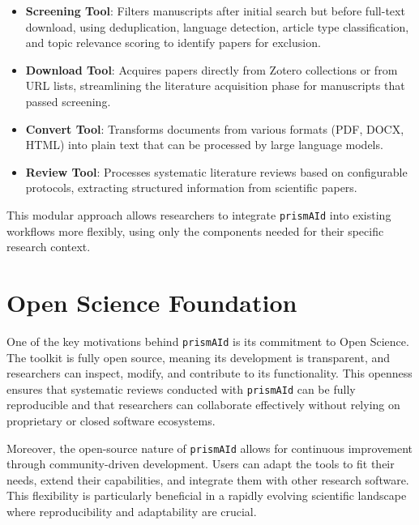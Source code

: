 \begin{itemize}
    \item \textbf{Screening Tool}: Filters manuscripts after initial search but before full-text download, using deduplication, language detection, article type classification, and topic relevance scoring to identify papers for exclusion.

    \item \textbf{Download Tool}: Acquires papers directly from Zotero collections or from URL lists, streamlining the literature acquisition phase for manuscripts that passed screening.

    \item \textbf{Convert Tool}: Transforms documents from various formats (PDF, DOCX, HTML) into plain text that can be processed by large language models.

    \item \textbf{Review Tool}: Processes systematic literature reviews based on configurable protocols, extracting structured information from scientific papers.
\end{itemize}

This modular approach allows researchers to integrate \texttt{prismAId} into existing workflows more flexibly, using only the components needed for their specific research context.

\section{Open Science Foundation}

One of the key motivations behind \texttt{prismAId} is its commitment to Open Science. The toolkit is fully open source, meaning its development is transparent, and researchers can inspect, modify, and contribute to its functionality. This openness ensures that systematic reviews conducted with \texttt{prismAId} can be fully reproducible and that researchers can collaborate effectively without relying on proprietary or closed software ecosystems.

Moreover, the open-source nature of \texttt{prismAId} allows for continuous improvement through community-driven development. Users can adapt the tools to fit their needs, extend their capabilities, and integrate them with other research software. This flexibility is particularly beneficial in a rapidly evolving scientific landscape where reproducibility and adaptability are crucial.

